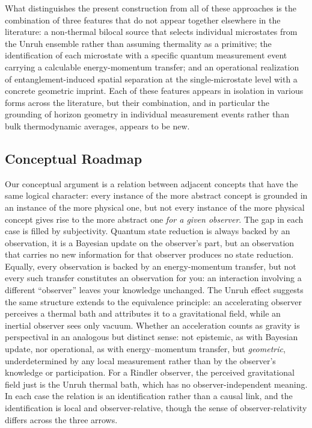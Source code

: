 \documentclass[12pt,a4paper]{article}
\begin{document}
What distinguishes the present construction from all of these 
approaches is the combination of three features that do not appear 
together elsewhere in the literature: a non-thermal bilocal source 
that selects individual microstates from the Unruh ensemble rather 
than assuming thermality as a primitive; the identification of each 
microstate with a specific quantum measurement event carrying a 
calculable energy-momentum transfer; and an operational realization 
of entanglement-induced spatial separation at the single-microstate level with a concrete geometric 
imprint. Each of these features appears in isolation in various 
forms across the literature, but their combination, and in 
particular the grounding of horizon geometry in individual 
measurement events rather than bulk thermodynamic averages,
appears to be new.





\subsection{Conceptual Roadmap}
Our conceptual argument is a relation between adjacent concepts that have the same logical character: every instance of the more abstract concept is grounded in an instance of the more physical one, but not every instance of the more physical concept gives rise to the more abstract one \emph{for a given observer}. The gap in each case is filled by subjectivity. Quantum state reduction is always backed by an observation, it is a Bayesian update on the observer's part, but an observation that carries no new information for that observer produces no state reduction. Equally, every observation is backed by an energy-momentum transfer, but not every such transfer constitutes an observation for you: an interaction involving a different ``observer'' leaves your knowledge unchanged. The Unruh effect suggests the same structure extends to the equivalence principle: an accelerating observer perceives a thermal bath and attributes it to a gravitational field, while an inertial observer sees only vacuum. Whether an acceleration counts as gravity is perspectival in an 
analogous but distinct sense: not epistemic, as with Bayesian 
update, nor operational, as with energy--momentum transfer, but 
\emph{geometric}, underdetermined by any local measurement 
rather than by the observer's knowledge or participation. For a 
Rindler observer, the perceived gravitational field just is the 
Unruh thermal bath, which has no observer-independent meaning. In 
each case the relation is an identification rather than a causal 
link, and the identification is local and observer-relative, though 
the sense of observer-relativity differs across the three arrows.
\end{document}
